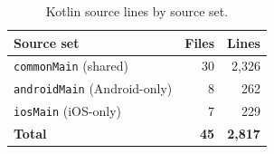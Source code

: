 \begin{table}[htbp]
\centering
\caption{Kotlin source lines by source set.}
\label{tab:loc}
\begin{tabular}{@{}lrr@{}}
\toprule
\textbf{Source set} & \textbf{Files} & \textbf{Lines} \\
\midrule
\texttt{commonMain} (shared) & 30 & 2{,}326 \\
\texttt{androidMain} (Android-only) & 8 & 262 \\
\texttt{iosMain} (iOS-only) & 7 & 229 \\
\midrule
\textbf{Total} & \textbf{45} & \textbf{2{,}817} \\
\bottomrule
\end{tabular}
\end{table}
